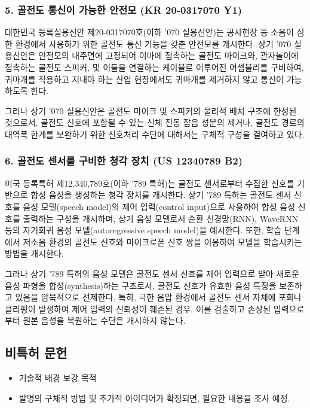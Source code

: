 \documentclass{article}
\begin{document}
\subsubsection*{5. 골전도 통신이 가능한 안전모 (KR 20-0317070 Y1)}

대한민국 등록실용신안 제20-0317070호(이하 '070 실용신안)는 공사현장 등 소음이 심한 환경에서 사용하기 위한 골전도 통신 기능을 갖춘 안전모를 개시한다.
상기 '070 실용신안은 안전모의 내주면에 고정되어 이마에 접촉하는 골전도 마이크와, 관자놀이에 접촉하는 골전도 스피커, 및 이들을 연결하는 케이블로 이루어진 어셈블리를 구비하여, 귀마개를 착용하고 지내야 하는 산업 현장에서도 귀마개를 제거하지 않고 통신이 가능하도록 한다.

그러나 상기 '070 실용신안은 골전도 마이크 및 스피커의 물리적 배치 구조에 한정된 것으로서, 골전도 신호에 포함될 수 있는 신체 진동 잡음 성분의 제거나, 골전도 경로의 대역폭 한계를 보완하기 위한 신호처리 수단에 대해서는 구체적 구성을 결여하고 있다.


\subsubsection*{6. 골전도 센서를 구비한 청각 장치 (US 12340789 B2)}

미국 등록특허 제12,340,789호(이하 '789 특허)는 골전도 센서로부터 수집한 신호를 기반으로 합성 음성을 생성하는 청각 장치를 개시한다.
상기 '789 특허는 골전도 센서 신호를 음성 모델(speech model)의 제어 입력(control input)으로 사용하여 합성 음성 신호를 출력하는 구성을 개시하며, 상기 음성 모델로서 순환 신경망(RNN), WaveRNN 등의 자기회귀 음성 모델(autoregressive speech model)을 예시한다.
또한, 학습 단계에서 저소음 환경의 골전도 신호와 마이크로폰 신호 쌍을 이용하여 모델을 학습시키는 방법을 개시한다.

그러나 상기 '789 특허의 음성 모델은 골전도 센서 신호를 제어 입력으로 받아 새로운 음성 파형을 합성(synthesis)하는 구조로서, 골전도 신호가 유효한 음성 특징을 보존하고 있음을 암묵적으로 전제한다. 
특히, 극한 음압 환경에서 골전도 센서 자체에 포화나 클리핑이 발생하여 제어 입력의 신뢰성이 훼손된 경우, 이를 검출하고 손상된 입력으로부터 원본 음성을 복원하는 수단은 개시하지 않는다.



\subsection{비특허 문헌}

\begin{itemize}
    \item 기술적 배경 보강 목적
    \item 발명의 구체적 방법 및 추가적 아이디어가 확정되면, 필요한 내용을 조사 예정.
\end{itemize}
\end{document}

